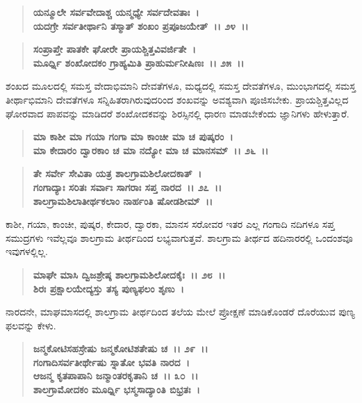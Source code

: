 \begin{verse}
\textbf{ಯನ್ಮೂಲೇ ಸರ್ವವೇದಾಶ್ಚ ಯನ್ಮಧ್ಯೇ ಸರ್ವದೇವತಾಃ~।}\\\textbf{ಯದಗ್ರೇ ಸರ್ವತೀರ್ಥಾನಿ ತಸ್ಮಾತ್ ಶಂಖಂ ಪ್ರಪೂಜಯೇತ್~।। ೨೪~।। }
\end{verse}

\begin{verse}
\textbf{ಸಂಪ್ರಾಪ್ತೇ ಪಾತಕೇ ಘೋರೇ ಪ್ರಾಯಶ್ಚಿತ್ತವಿವರ್ಜಿತೇ~।}\\\textbf{ಮೂರ್ಧ್ನಿ ಶಂಖೋದಕಂ ಗ್ರಾಹ್ಯಮಿತಿ ಪ್ರಾಹುರ್ಮನೀಷಿಣಃ~।। ೨೫~।।}
\end{verse}

ಶಂಖದ ಮೂಲದಲ್ಲಿ ಸಮಸ್ತ ವೇದಾಭಿಮಾನಿ ದೇವತೆಗಳೂ, ಮಧ್ಯದಲ್ಲಿ ಸಮಸ್ತ ದೇವತೆಗಳೂ, ಮುಂಭಾಗದಲ್ಲಿ ಸಮಸ್ತ ತೀರ್ಥಾಭಿಮಾನಿ ದೇವತೆಗಳೂ ಸನ್ನಿಹಿತರಾಗಿರುವುದರಿಂದ ಶಂಖವನ್ನು ಅವಶ್ಯವಾಗಿ ಪೂಜಿಸಬೇಕು. ಪ್ರಾಯಶ್ಚಿತ್ತವಿಲ್ಲದ ಘೋರವಾದ ಪಾಪವನ್ನು ಮಾಡಿದರೆ ಶಂಖೋದಕವನ್ನು ಶಿರಸ್ಸಿನಲ್ಲಿ ಧಾರಣ ಮಾಡಬೇಕೆಂದು ಜ್ಞಾನಿಗಳು ಹೇಳುತ್ತಾರೆ.

\begin{verse}
\textbf{ಮಾ ಕಾಶೀ ಮಾ ಗಯಾ ಗಂಗಾ ಮಾ ಕಾಂಚೀ ಮಾ ಚ ಪುಷ್ಕರಂ~।}\\\textbf{ಮಾ ಕೇದಾರಂ ದ್ವಾರಕಾಂ ಚ ಮಾ ನದ್ಯೋ ಮಾ ಚ ಮಾನಸಮ್~।। ೨೬~।।} 
\end{verse}

\begin{verse}
\textbf{ತೇ ಸರ್ವೇ ಸೇವಿತಾ ಯತ್ರ ಶಾಲಗ್ರಾಮಶಿಲೋದಕಾತ್~।}\\\textbf{ಗಂಗಾದ್ಯಾಃ ಸರಿತಃ ಸರ್ವಾಃ ಸಾಗರಾಃ ಸಪ್ತ ನಾರದ~।। ೨೭~।।} \\\textbf{ಶಾಲಗ್ರಾಮಶಿಲಾತೀರ್ಥಕಲಾಂ ನಾರ್ಹಂತಿ ಷೋಡಶೀಮ್~।।}
\end{verse}

ಕಾಶೀ, ಗಯಾ, ಕಾಂಚೀ, ಪುಷ್ಕರ, ಕೇದಾರ, ದ್ವಾರಕಾ, ಮಾನಸ ಸರೋವರ ಇತರ ಎಲ್ಲ ಗಂಗಾದಿ ನದಿಗಳೂ ಸಪ್ತ ಸಮುದ್ರಗಳು ಇವೆಲ್ಲವೂ ಶಾಲಗ್ರಾಮ ತೀರ್ಥದಿಂದ ಲಭ್ಯವಾಗುತ್ತವೆ. ಶಾಲಗ್ರಾಮ ತೀರ್ಥದ ಹದಿನಾರರಲ್ಲಿ ಒಂದಂಶವೂ ಇವುಗಳಲ್ಲಿಲ್ಲ.

\begin{verse}
\textbf{ಮಾಘೇ ಮಾಸಿ ದ್ವಿಜಶ್ರೇಷ್ಠ ಶಾಲಗ್ರಾಮಶಿಲೋದಕೈಃ~।। ೨೮~।। }\\\textbf{ಶಿರಃ ಪ್ರಕ್ಷಾಲಯೇದ್ಯಸ್ತು ತಸ್ಯ ಪುಣ್ಯಫಲಂ ಶೃಣು~।}
\end{verse}

ನಾರದನೇ, ಮಾಘಮಾಸದಲ್ಲಿ ಶಾಲಗ್ರಾಮ ತೀರ್ಥದಿಂದ ತಲೆಯ ಮೇಲೆ ಪ್ರೋಕ್ಷಣೆ ಮಾಡಿಕೊಂಡರೆ ದೊರೆಯುವ ಪುಣ್ಯ ಫಲವನ್ನು ಕೇಳು.

\begin{verse}
\textbf{ಜನ್ಮಕೋಟಿಸಹಸ್ರೇಷು ಜನ್ಮಕೋಟಿಶತೇಷು ಚ~।। ೨೯~।।}\\\textbf{ಗಂಗಾದಿಸರ್ವತೀರ್ಥೇಷು ಸ್ನಾತೋ ಭವತಿ ನಾರದ~। }\\\textbf{ಆಜನ್ಮ ಕೃತಪಾಪಾನಿ ಜನ್ಮಾಂತರಕೃತಾನಿ ಚ~।। ೩೦~।।} \\\textbf{ಶಾಲಗ್ರಾಮೋದಕಂ ಮೂರ್ಧ್ನಿ ಭಸ್ಮಸಾದ್ಯಾಂತಿ ಬಿಭ್ರತಃ~।}
\end{verse}

